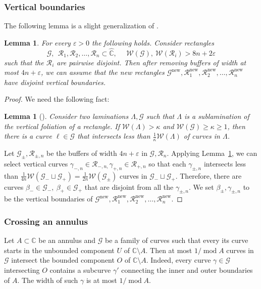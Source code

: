 \documentclass{amsart}
\renewcommand{\sp}{{\ \ }}
\newcommand{\1}{{\mathbb 1 }}
\newcommand{\reminder}[1]{\textsl{$\lhd\rhd$#1$\lhd\rhd$}\marginpar{$\lhd\rhd\lhd\rhd\lhd\rhd$}}
\newcommand{\FamG}{{\mathcal G}}
\newcommand{\Width}{{\mathcal W}}
\newcommand\RR{\mathcal{R}}
\newcommand\new{{\operatorname{new}}}
\newcommand{\wC}{\widehat{\mathbb{C}}}
\newcommand{\C}{\mathbb{C}}
\newtheorem{lem}[thm]{Lemma}
\theoremstyle{remark}
\numberwithin{equation}{section}
\theoremstyle{definition}
\renewcommand{\mod}{\operatorname{mod}}
\begin{document}
\subsubsection{Vertical boundaries}
\label{sss:sm overl princ} The following lemma is a slight generalization of \cite[Lemma 2.14]{KL}.

\begin{lem}
\label{lem:vet boundar} For every $\varepsilon>0$ the following holds. Consider rectangles \[\FamG, \sp \RR_1, \RR_2,\dots, \RR_n\subset \wC ,\sp\sp  \sp \Width(\FamG),\ \Width(\RR_i)>  8n+2\varepsilon\] such that the $\RR_i$ are pairwise disjoint. Then after removing buffers of width at most $4n+\varepsilon$, we can assume that the new rectangles $\FamG^\new, \RR^\new_1,\RR^\new_2,\dots,\RR^\new_n$ have disjoint vertical boundaries.
\end{lem}


\begin{proof} We need the following fact:

\begin{lem}[{\cite[Lemma 2.13]{KL}}]
\label{lem:inters of wide lamin} Consider two laminations $\Lambda,\FamG$ such that $\Lambda$ is a sublamination of the vertical foliation of a rectangle. If $\Width(\Lambda)>\kappa$ and $\Width(\FamG)\ge \kappa \ge1$, then there is a curve $\ell \in \FamG$ that intersects less than $\frac  1 \kappa \Width (\Lambda)$ of curves in $\Lambda$.
\end{lem}

 Let $\FamG_{\pm}, \RR_{\pm, n}$ be the buffers of width $4n+\varepsilon$ in $\FamG, \RR_n$. Applying Lemma~\ref{lem:inters of wide lamin}, we can select vertical curves $\gamma_{-,n}\in \RR_{-,n,} \gamma_{+,n}\in \RR_{+,n}$ so that each $\gamma_{\pm,n}$ intersects less than $\frac{1}{4n}\Width(\FamG_{-}\sqcup \FamG_{+})=\frac{1}{2n}\Width(\FamG_{\pm})$ curves in $\FamG_{-}\sqcup \FamG_{+}$.  Therefore, there are curves $\beta_-\in \FamG_-, \ \beta_+\in \FamG_+$ that are disjoint from all the $\gamma_{\pm,n}$. We set $\beta_{\pm}, \gamma_{\pm,n}$ to be the vertical boundaries of  $\FamG^\new, \RR^\new_1,\RR^\new_2,\dots,\RR^\new_n$.
\end{proof}









\subsubsection{Crossing an annulus}
\label{sss:cross ann}
Let $A\subset \C$ be an annulus and $\FamG$ be a family of curves such that every its curve starts in the unbounded component $U$ of $\C\setminus A$. Then at most $1/\mod A$ curves in $\FamG$ intersect the bounded component $O$ of $\C\setminus A$. Indeed, every curve $\gamma\in \FamG$ intersecting $O$ contains a subcurve $\gamma'$ connecting the inner and outer boundaries of $A$. The width of such $\gamma$ is at most $1/\mod A$. 
\end{document}
